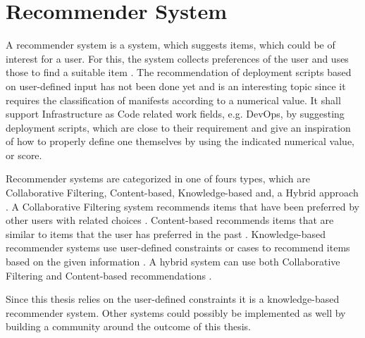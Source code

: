\section{Recommender System}
\label{sec:background-recommender}
A recommender system is a system, which suggests items, which could be of interest for a user. For this, the system collects preferences of the user and uses those to find a suitable item \cite{recommender}.
The recommendation of deployment scripts based on user-defined input has not been done yet and is an interesting topic since it requires the classification of manifests according to a numerical value. It shall support Infrastructure as Code related work fields, e.g. DevOps, by suggesting deployment scripts, which are close to their requirement and give an inspiration of how to properly define one themselves by using the indicated numerical value, or score.

Recommender systems are categorized in one of fours types, which are Collaborative Filtering, Content-based, Knowledge-based and, a Hybrid approach \cite{recommender}\cite{recommender2}.
A Collaborative Filtering system recommends items that have been preferred by other users with related choices \cite{recommender}.
Content-based recommends items that are similar to items that the user has preferred in the past \cite{recommender}.
Knowledge-based recommender systems use user-defined constraints or cases to recommend items based on the given information \cite{recommender2}.
A hybrid system can use both Collaborative Filtering and Content-based recommendations \cite{recommender}\cite{recommender2}.

Since this thesis relies on the user-defined constraints it is a knowledge-based recommender system. Other systems could possibly be implemented as well by building a community around the outcome of this thesis.
